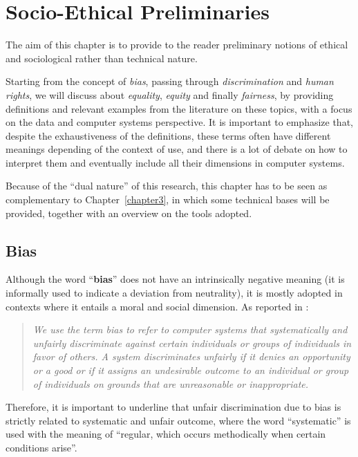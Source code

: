 \chapter{Socio-Ethical Preliminaries}
\label{chapter2}
\thispagestyle{empty}

The aim of this chapter is to provide to the reader preliminary notions of ethical and sociological rather than technical nature.

Starting from the concept of \textit{bias}, passing through \textit{discrimination} and \textit{human rights}, we will discuss about \textit{equality}, \textit{equity} and finally \textit{fairness}, by providing definitions and relevant examples from the literature on these topics, with a focus on the data and computer systems perspective. It is important to emphasize that, despite the exhaustiveness of the definitions, these terms often have different meanings depending of the context of use, and there is a lot of debate on how to interpret them and eventually include all their dimensions in computer systems.

Because of the ``dual nature'' of this research, this chapter has to be seen as complementary to Chapter~\ref{chapter3}, in which some technical bases will be provided, together with an overview on the tools adopted.


\section{Bias}
\label{section:bias}
Although the word ``\textbf{bias}'' does not have an intrinsically negative meaning (it is informally used to indicate a deviation from neutrality), it is mostly adopted in contexts where it entails a moral and social dimension. As reported in \cite{friedman2017bias}:
\begin{quote}\emph{We use the term bias to refer to computer systems that \emph{systematically} and \emph{unfairly discriminate} against certain individuals or groups of individuals in favor of others. A system discriminates unfairly if it denies an opportunity or a good or if it assigns an undesirable outcome to an individual or group of individuals on grounds that are unreasonable or inappropriate.} \cite[p.~332]{friedman2017bias}\end{quote}
Therefore, it is important to underline that unfair discrimination due to bias is strictly related to systematic and unfair outcome, where the word ``systematic'' is used with the meaning of ``regular, which occurs methodically when certain conditions arise''.

